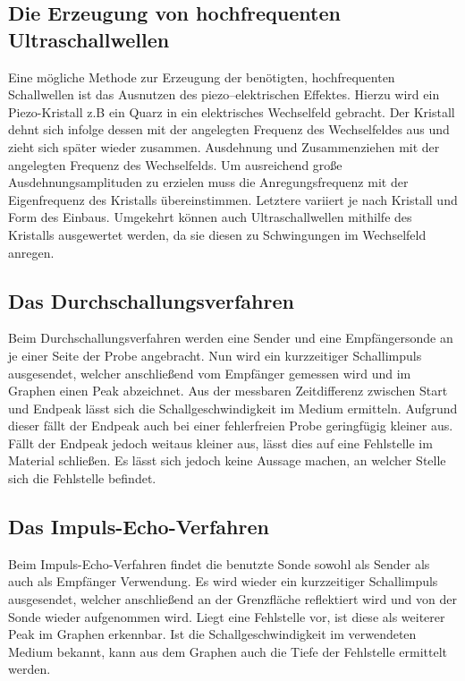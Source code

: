 \subsection{Die Erzeugung von hochfrequenten Ultraschallwellen}
Eine mögliche Methode zur Erzeugung der benötigten, hochfrequenten Schallwellen
ist das Ausnutzen des piezo--elektrischen Effektes. Hierzu wird ein Piezo-Kristall z.B ein Quarz
in ein elektrisches Wechselfeld gebracht. Der Kristall dehnt sich infolge dessen
mit der angelegten Frequenz des Wechselfeldes aus und zieht sich später wieder zusammen.
Ausdehnung und Zusammenziehen mit der angelegten Frequenz des Wechselfelds. Um
ausreichend große Ausdehnungsamplituden zu erzielen muss die Anregungsfrequenz
mit der Eigenfrequenz des Kristalls übereinstimmen. Letztere variiert je nach Kristall
und Form des Einbaus. Umgekehrt können auch Ultraschallwellen mithilfe des Kristalls
ausgewertet werden, da sie diesen zu Schwingungen im Wechselfeld anregen.
\subsection{Das Durchschallungsverfahren}
Beim Durchschallungsverfahren werden eine Sender und eine Empfängersonde an je
einer Seite der Probe angebracht. Nun wird ein kurzzeitiger Schallimpuls ausgesendet, welcher
anschließend vom Empfänger gemessen wird und im Graphen einen Peak abzeichnet. Aus
der messbaren Zeitdifferenz zwischen Start und Endpeak lässt sich die Schallgeschwindigkeit im Medium ermitteln. Aufgrund dieser fällt der Endpeak auch bei einer fehlerfreien Probe geringfügig kleiner aus. Fällt der Endpeak jedoch weitaus kleiner aus, lässt dies auf eine Fehlstelle im Material schließen.
Es lässt sich jedoch keine Aussage machen, an welcher Stelle sich die Fehlstelle befindet.

\subsection{Das Impuls-Echo-Verfahren}
Beim Impuls-Echo-Verfahren findet die benutzte Sonde sowohl als Sender als auch
als Empfänger Verwendung. Es wird wieder ein kurzzeitiger Schallimpuls ausgesendet,
welcher anschließend an der Grenzfläche reflektiert wird und von der Sonde wieder aufgenommen wird.
Liegt eine Fehlstelle vor, ist diese als weiterer Peak im Graphen erkennbar. Ist
die Schallgeschwindigkeit im verwendeten Medium bekannt, kann aus dem Graphen
auch die Tiefe der Fehlstelle ermittelt werden.

